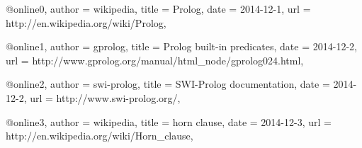 @online{0,
	author = {wikipedia},
	title = {Prolog},
	date = {2014-12-1},
	url = {http://en.wikipedia.org/wiki/Prolog},
}

@online{1,
	author = {gprolog},
	title = {Prolog built-in predicates},
	date = {2014-12-2},
	url = {http://www.gprolog.org/manual/html\_node/gprolog024.html},
}


@online{2,
	author = {swi-prolog},
	title = {SWI-Prolog documentation},
	date = {2014-12-2},
	url = {http://www.swi-prolog.org/},
}


@online{3,
	author = {wikipedia},
	title = {horn clause},
	date = {2014-12-3},
	url = {http://en.wikipedia.org/wiki/Horn\_clause},
}

